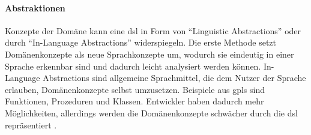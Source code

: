     \paragraph{Abstraktionen}
    Konzepte der Domäne kann eine \gls{dsl} in Form von
    "`Linguistic Abstractions"' oder durch "`In-Language Abstractions"'
    widerspiegeln.
    Die erste Methode setzt Domänenkonzepte als neue Sprachkonzepte um,
    wodurch sie eindeutig in einer Sprache erkennbar sind
    und dadurch leicht analysiert werden können.
    In-Language Abstractions sind allgemeine Sprachmittel,
    die dem Nutzer der Sprache erlauben, Domänenkonzepte selbst umzusetzen.
    Beispiele aus \glspl{gpl} sind Funktionen, Prozeduren und Klassen.
    Entwickler haben dadurch mehr Möglichkeiten,
    allerdings werden die Domänenkonzepte schwächer durch die \gls{dsl}
    repräsentiert
    \cite[Kapitel 4.1.2]{voelter:DslEngineering}.